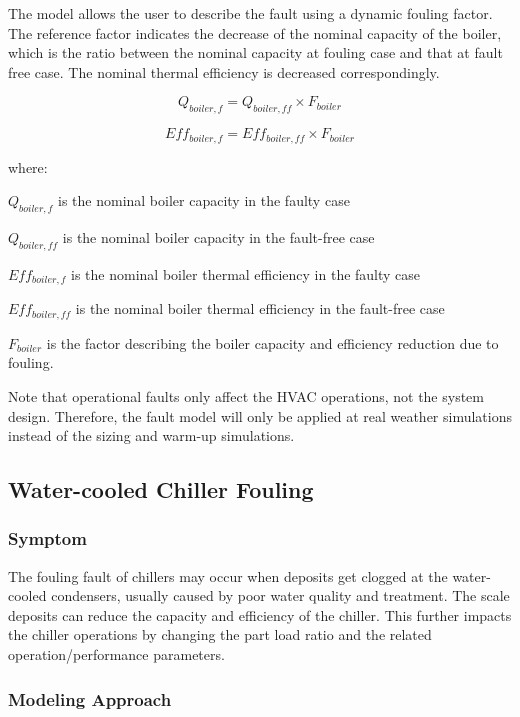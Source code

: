 The model allows the user to describe the fault using a dynamic fouling factor. The reference factor indicates the decrease of the nominal capacity of the boiler, which is the ratio between the nominal capacity at fouling case and that at fault free case. The nominal thermal efficiency is decreased correspondingly.

\begin{equation}
Q_{boiler,f} = Q_{boiler,ff} \times F_{boiler}
\end{equation}

\begin{equation}
Eff_{boiler,f} = Eff_{boiler,ff} \times F_{boiler}
\end{equation}

where:

\(Q_{boiler,f}\) is the nominal boiler capacity in the faulty case

\(Q_{boiler,ff}\) is the nominal boiler capacity in the fault-free case

\(Eff_{boiler,f}\) is the nominal boiler thermal efficiency in the faulty case

\(Eff_{boiler,ff}\) is the nominal boiler thermal efficiency in the fault-free case

\(F_{boiler}\) is the factor describing the boiler capacity and efficiency reduction due to fouling.

Note that operational faults only affect the HVAC operations, not the system design. Therefore, the fault model will only be applied at real weather simulations instead of the sizing and warm-up simulations.


\subsection{Water-cooled Chiller Fouling}\label{water-cooled-chiller-fouling}

\subsubsection{Symptom}

The fouling fault of chillers may occur when deposits get clogged at the water-cooled condensers, usually caused by poor water quality and treatment. The scale deposits can reduce the capacity and efficiency of the chiller. This further impacts the chiller operations by changing the part load ratio and the related operation/performance parameters.

\subsubsection{Modeling Approach}

